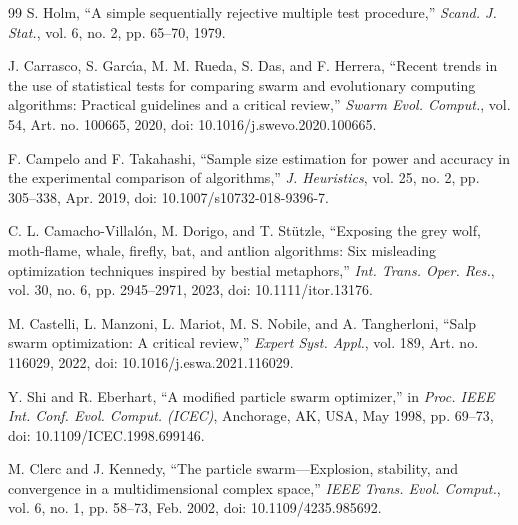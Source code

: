 {\begin{thebibliography}{99}
S. Holm, ``A simple sequentially rejective multiple test procedure,'' \textit{Scand. J. Stat.}, vol. 6, no. 2, pp. 65--70, 1979.

J. Carrasco, S. Garc\'{\i}a, M. M. Rueda, S. Das, and F. Herrera, ``Recent trends in the use of statistical tests for comparing swarm and evolutionary computing algorithms: Practical guidelines and a critical review,'' \textit{Swarm Evol. Comput.}, vol. 54, Art. no. 100665, 2020, doi: 10.1016/j.swevo.2020.100665.

F. Campelo and F. Takahashi, ``Sample size estimation for power and accuracy in the experimental comparison of algorithms,'' \textit{J. Heuristics}, vol. 25, no. 2, pp. 305--338, Apr. 2019, doi: 10.1007/s10732-018-9396-7.

C. L. Camacho-Villal\'on, M. Dorigo, and T. St\"utzle, ``Exposing the grey wolf, moth-flame, whale, firefly, bat, and antlion algorithms: Six misleading optimization techniques inspired by bestial metaphors,'' \textit{Int. Trans. Oper. Res.}, vol. 30, no. 6, pp. 2945--2971, 2023, doi: 10.1111/itor.13176.

M. Castelli, L. Manzoni, L. Mariot, M. S. Nobile, and A. Tangherloni, ``Salp swarm optimization: A critical review,'' \textit{Expert Syst. Appl.}, vol. 189, Art. no. 116029, 2022, doi: 10.1016/j.eswa.2021.116029.

Y. Shi and R. Eberhart, ``A modified particle swarm optimizer,'' in \textit{Proc. IEEE Int. Conf. Evol. Comput. (ICEC)}, Anchorage, AK, USA, May 1998, pp. 69--73, doi: 10.1109/ICEC.1998.699146.

M. Clerc and J. Kennedy, ``The particle swarm---Explosion, stability, and convergence in a multidimensional complex space,'' \textit{IEEE Trans. Evol. Comput.}, vol. 6, no. 1, pp. 58--73, Feb. 2002, doi: 10.1109/4235.985692.


\end{thebibliography}}
